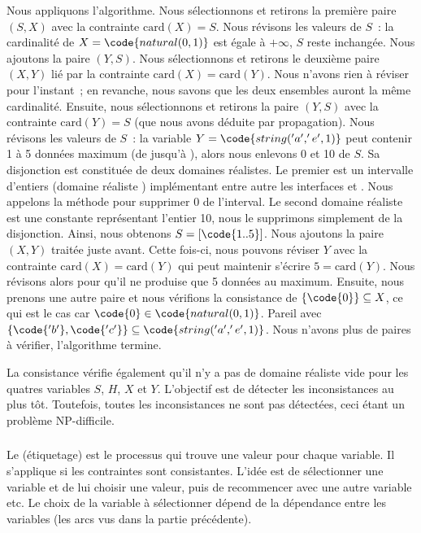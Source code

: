 \begin{example}
Nous appliquons l'algorithme. Nous sélectionnons et retirons la première paire
$(S, X)$ avec la contrainte $\mathrm{card}(X) = S$. Nous révisons les valeurs de
$S$~: la cardinalité de $X = \code{natural(0, 1)}$ est égale à $+\infty$, $S$
reste inchangée. Nous ajoutons la paire $(Y, S)$. Nous sélectionnons et retirons
le deuxième paire $(X, Y)$ lié par la contrainte $\mathrm{card}(X) =
\mathrm{card}(Y)$. Nous n'avons rien à réviser pour l'instant~; en revanche,
nous savons que les deux ensembles auront la même cardinalité. Ensuite, nous
sélectionnons et retirons la paire $(Y, S)$ avec la contrainte $\mathrm{card}(Y)
= S$ (que nous avons déduite par propagation). Nous révisons les valeurs de
$S$~: la variable $Y = \code{string('a', 'e', 1)}$ peut contenir 1 à 5 données
maximum (de  jusqu'à ), alors nous enlevons 0 et 10 de $S$. Sa
disjonction est constituée de deux domaines réalistes. Le premier est un
intervalle d'entiers (domaine réaliste ) implémentant entre
autre les interfaces  et . Nous appelons la
méthode  pour supprimer 0 de l'interval. Le second domaine
réaliste est une constante représentant l'entier 10, nous le supprimons
simplement de la disjonction. Ainsi, nous obtenons $S = [\code{1..5}]$. Nous
ajoutons la paire $(X, Y)$ traitée juste avant. Cette fois-ci, nous pouvons
réviser $Y$ avec la contrainte $\mathrm{card}(X) = \mathrm{card}(Y)$ qui peut
maintenir s'écrire $5 = \mathrm{card}(Y)$. Nous révisons alors  pour qu'il ne produise que 5 données au maximum. Ensuite, nous prenons une
autre paire et nous vérifions la consistance de $\{\code{0}\} \subseteq X$, ce
qui est le cas car $\code{0} \in \code{natural(0, 1)}$. Pareil avec
$\{\code{'b'}, \code{'c'}\} \subseteq \code{string('a', 'e', 1)}$. Nous n'avons
plus de paires à vérifier, l'algorithme termine.

\end{example}

La consistance vérifie également qu'il n'y a pas de domaine réaliste vide pour
les quatres variables $S$, $H$, $X$ et $Y$. L'objectif est de détecter les
inconsistances au plus tôt. Toutefois, toutes les inconsistances ne sont pas
détectées, ceci étant un problème NP-difficile.

\subsubsection{}

Le  (étiquetage) est le processus qui trouve une valeur
pour chaque variable. Il s'applique si les contraintes sont consistantes. L'idée
est de sélectionner une variable et de lui choisir une valeur, puis de
recommencer avec une autre variable etc. Le choix de la variable à sélectionner
dépend de la dépendance entre les variables (les arcs vus dans la partie
précédente).

